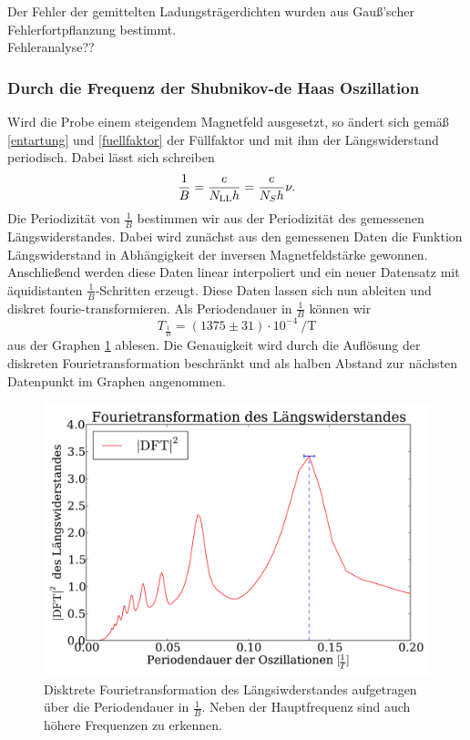 \documentclass[paper=a4,fontsize=10pt,DIV=18,twocolumn,parskip=half]{scrartcl}
\numberwithin{equation}{section}    %
\newcommand{\note}[1]{{\color{red}#1??}}
\begin{document}
Der Fehler der gemittelten Ladungsträgerdichten wurden aus Gauß'scher Fehlerfortpflanzung bestimmt.\\
\note{Fehleranalyse}

\subsubsection*{Durch die Frequenz der Shubnikov-de Haas Oszillation}
Wird die Probe einem steigendem Magnetfeld ausgesetzt, so ändert sich gemäß \eqref{entartung} und \eqref{fuellfaktor} der Füllfaktor und mit ihm der Längswiderstand periodisch. Dabei lässt sich schreiben
\begin{equation}
\frac{1}{B}=\frac{e}{N_{\rm LL} h}=\frac{e}{N_S h} \nu.
\end{equation}
Die Periodizität von $\frac{1}{B}$ bestimmen wir aus der Periodizität des gemessenen Längswiderstandes. Dabei wird zunächst aus den gemessenen Daten die Funktion Längswiderstand in Abhängigkeit der inversen Magnetfeldstärke gewonnen. Anschließend werden diese Daten linear interpoliert und ein neuer Datensatz mit äquidistanten $\frac{1}{B}$-Schritten erzeugt. Diese Daten lassen sich nun ableiten und diskret fourie-transformieren. Als Periodendauer in $\frac{1}{B}$ können wir
\begin{equation}
T_{\frac{1}{B}}=(1375\pm 31) \cdot 10^{-4}\SI{}{\per\tesla}
\label{periodizitaet}
\end{equation}
aus der Graphen \ref{fft} ablesen. Die Genauigkeit wird durch die Auflösung der diskreten Fourietransformation beschränkt und als halben Abstand zur nächsten Datenpunkt im Graphen angenommen.

\begin{figure}[]
	\begin{center}
		\includegraphics[width=\columnwidth]{Data-Plots/06-Fourietransformation.pdf}
		\caption{Disktrete Fourietransformation des Längsiwderstandes aufgetragen über die Periodendauer in $\frac{1}{B}$. Neben der Hauptfrequenz sind auch höhere Frequenzen zu erkennen.}
		\label{fft}
	\end{center}
\end{figure}
\end{document}
